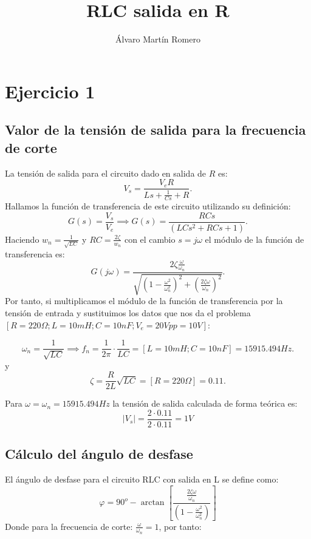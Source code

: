 \documentclass[11pt,letterpaper]{article}
\title{RLC salida en R}
\author{Álvaro Martín Romero}
\begin{document}
\maketitle
\tableofcontents
\section{Ejercicio 1}%
\label{sec:Muestra del circuito}
\subsection{Valor de la tensión de salida para la frecuencia de corte}
La tensión de salida para el circuito dado en salida de $R$ es:
\[
V_s=\frac{V_e R}{Ls+\frac{1}{Cs}+R}
.\] 
Hallamos la función de transferencia de este circuito utilizando su definición:
\[
    G\left( s \right) =\frac{V_s}{V_e} \implies G\left( s \right) =\frac{RCs}{\left( LCs^2+ RCs + 1 \right) }
.\] 
Haciendo $w_n=\frac{1}{\sqrt{LC} }$ y $RC=\frac{2\zeta}{w_n}$ con el cambio $s=j\omega$ el módulo de la función de transferencia es:
 \[
     G\left( j\omega \right) =\frac{2\zeta \frac{\omega}{\omega_n}}{\sqrt{\left( 1-\frac{\omega^2}{\omega_n^2} \right)^2+ \left( \frac{2\zeta \omega }{\omega_n} \right)^2  } }  
.\] 
Por tanto, si multiplicamos el módulo de la función de transferencia por la tensión de entrada y sustituimos los datos que nos da el problema $[R=220 \Omega ; L=10 mH; C=10nF; V_e =20Vpp=10 V]$:

\[
	\omega_{n}=\frac{1}{\sqrt{LC} }\implies f_n=\frac{1}{2\pi}\cdot \frac{1}{LC}=[L=10 mH; C= 10 nF]=15915.494 Hz 
.\] 
y 
 \[
	 \zeta=\frac{R}{2L}\sqrt{LC} =[R= 220 \Omega] =0.11
.\] 

Para $\omega=\omega_n= 15915.494Hz$ la tensión de salida calculada de forma teórica es:
\begin{equation}
	\boxed{ \mid V_s \mid =\frac{2\cdot 0.11}{2\cdot 0.11}=1 V}
\end{equation}

\subsection{Cálculo del ángulo de desfase}
El ángulo de desfase para el circuito RLC con salida en L se define como:
\begin{equation}
    \varphi=90^o - \arctan\left[ \frac{\frac{2\zeta \omega}{\omega_n}}{\left( 1-\frac{\omega^2}{\omega_n^2} \right) } \right] 
    \label{desfase}
\end{equation}
Donde para la frecuencia de corte: $\frac{\omega}{\omega_n}=1$, por tanto:
\end{document}
